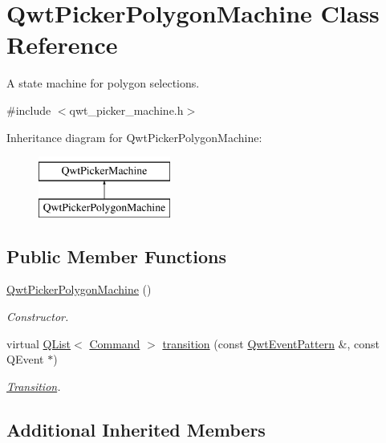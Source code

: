 \hypertarget{class_qwt_picker_polygon_machine}{\section{Qwt\-Picker\-Polygon\-Machine Class Reference}
\label{class_qwt_picker_polygon_machine}
}


A state machine for polygon selections.  




{\ttfamily \#include $<$qwt\-\_\-picker\-\_\-machine.\-h$>$}

Inheritance diagram for Qwt\-Picker\-Polygon\-Machine\-:\begin{figure}[H]
\begin{center}
\leavevmode
\includegraphics[height=2.000000cm]{class_qwt_picker_polygon_machine}
\end{center}
\end{figure}
\subsection*{Public Member Functions}
\begin{DoxyCompactItemize}
\item 
\hyperlink{class_qwt_picker_polygon_machine_ab6da61726ca16c06a1d9c02f067492c6}{Qwt\-Picker\-Polygon\-Machine} ()
\begin{DoxyCompactList}\small\item\em Constructor. \end{DoxyCompactList}\item 
virtual \hyperlink{class_q_list}{Q\-List}$<$ \hyperlink{class_qwt_picker_machine_a3a8d3d4c107ce5f8351e4cbdd38c43f7}{Command} $>$ \hyperlink{class_qwt_picker_polygon_machine_a3a5466ca9faa33603a0b6ced6aa96791}{transition} (const \hyperlink{class_qwt_event_pattern}{Qwt\-Event\-Pattern} \&, const Q\-Event $\ast$)
\begin{DoxyCompactList}\small\item\em \hyperlink{class_transition}{Transition}. \end{DoxyCompactList}\end{DoxyCompactItemize}
\subsection*{Additional Inherited Members}


